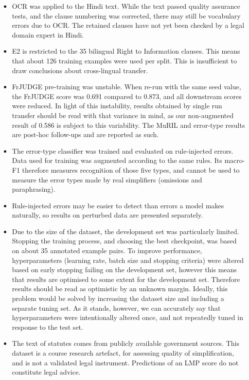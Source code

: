 \documentclass[conference]{IEEEtran}
\begin{document}
\begin{itemize}
\item OCR was applied to the Hindi text. While the text passed quality assurance tests, and the clause numbering was corrected, there may still be vocabulary errors due to OCR. The retained clauses have not yet been checked by a legal domain expert in Hindi.
\item E2 is restricted to the 35 bilingual Right to Information clauses. This means that about 126 training examples were used per split. This is insufficient to draw conclusions about cross-lingual transfer.
\item FrJUDGE pre-training was unstable. When re-run with the same seed value, the FrJUDGE score was 0.691 compared to 0.873, and all downstream scores were reduced. In light of this instability, results obtained by single run transfer should be read with that variance in mind, as our non-augmented result of 0.586 is subject to this variability. The MuRIL and error-type results are post-hoc follow-ups and are reported as such.
\item The error-type classifier was trained and evaluated on rule-injected errors. Data used for training was augmented according to the same rules. Its macro-F1 therefore measures recognition of those five types, and cannot be used to measure the error types made by real simplifiers (omissions and paraphrasing).
\item Rule-injected errors may be easier to detect than errors a model makes naturally, so results on perturbed data are presented separately.
\item Due to the size of the dataset, the development set was particularly limited. Stopping the training process, and choosing the best checkpoint, was based on about 35 annotated example pairs. To improve performance, hyperparameters (learning rate, batch size and stopping criteria) were altered based on early stopping failing on the development set, however this means that results are optimised to some extent for the development set. Therefore results should be read as optimistic by an unknown margin. Ideally, this problem would be solved by increasing the dataset size and including a separate tuning set. As it stands, however, we can accurately say that hyperparameters were intentionally altered once, and not repeatedly tuned in response to the test set.
\item The text of statutes comes from publicly available government sources. This dataset is a course research artefact, for assessing quality of simplification, and is not a validated legal instrument. Predictions of an LMP score do not constitute legal advice.
\end{itemize}
\end{document}

